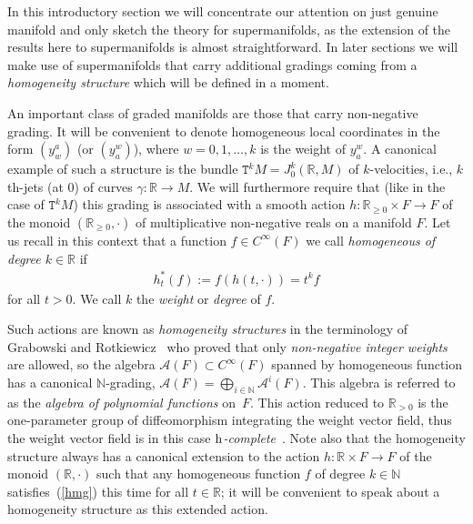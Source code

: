 \documentclass[pdftex]{sigma}
\def\sT{{\mathtt T}}
\numberwithin{equation}{section}
\begin{document}
In this introductory section we will concentrate our attention on just genuine manifold and only sketch the theory for supermanifolds, as the extension of the results here to supermanifolds is almost straightforward. In later sections we will make use of supermanifolds that carry additional gradings coming from a \emph{homogeneity structure} which will be def\/ined in a moment.

An important class of graded manifolds are those that carry non-negative grading.  It will be convenient to denote homogeneous local coordinates in the form $(y^a_w)$ (or $(y^w_a)$), where $w=0,1,\dots,k$ is the weight of $y^w_a$.
A canonical example of such a structure is the bundle $\sT^kM=J^k_0({\mathbb R},M)$ of $k$-velocities, i.e., $k$th-jets (at $0$) of curves $\gamma\colon {\mathbb R}\to M$. We will furthermore require that (like in the case of $\sT^kM$) this grading is associated with a smooth action $h\colon {\mathbb R}_{\ge 0}\times F\to F$ of the monoid $({\mathbb R}_{\ge 0},\cdot)$ of multiplicative non-negative reals on a manifold $F$. Let us recall in this context that a function $f\in C^\infty(F)$ we call \emph{homogeneous of degree $k\in{\mathbb R}$} if
\begin{gather}\label{hmg}
h_t^*(f):=f(h(t,\cdot))=t^k f
\end{gather}
for all $t>0$. We call $k$  the \emph{weight}  or \emph{degree} of $f$.

Such actions are known as  \emph{homogeneity structures} in the terminology of  Grabowski and Rot\-kie\-wicz~\cite{Grabowski2012} who proved that only \emph{non-negative integer weights} are allowed, so the algebra $\mathcal{A}(F)\subset C^\infty(F)$ spanned by homogeneous function  has a canonical $\mathbb{N}$-grading, $\mathcal{A}(F) = \bigoplus_{i \in \mathbb{N}}\mathcal{A}^{i}(F)$. This algebra  is referred to as the \emph{algebra of polynomial functions} on~$F$.  This action reduced to ${\mathbb R}_{>0}$ is the one-parameter group of dif\/feomorphism integrating the weight vector f\/ield, thus the weight vector f\/ield is in this case \emph{${\rm h}$-complete}~\cite{Grabowski2013}.  Note also that the homogeneity structure always has a canonical extension to the action $h\colon {\mathbb R}\times F\to F$ of the monoid $({\mathbb R},\cdot)$ such that any homogeneous function $f$ of degree $k\in\mathbb{N}$ satisf\/ies~(\ref{hmg}) this time for all $t\in{\mathbb R}$; it will be convenient to speak about a homogeneity structure as  this extended action.
\end{document}
